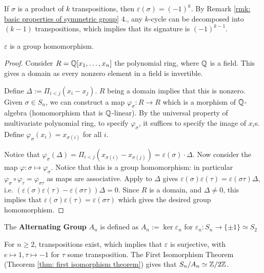 \documentclass{article}
\begin{document}
\begin{example}
    If $\sigma$ is a product of $k$ transpositions, then $\varepsilon(\sigma)= (-1)^k$. By Remark \ref{rmk: basic properties of symmetric group} 4., any $k$-cycle can be decomposed into $(k-1)$ transpositions, which implies that its signature is $(-1)^{k-1}$.
\end{example}

\begin{proposition}
    $\varepsilon$ is a group homomorphism.
\end{proposition}

\begin{proof}
    Consider $R = \mathbb{Q}[x_1, \dots, x_n]$ the polynomial ring, where $\mathbb{Q}$ is a field. This gives a domain as every nonzero element in a field is invertible. 

    Define $\Delta := \Pi_{i < j} (x_i - x_j)$. $R$ being a domain implies that this is nonzero. Given $\sigma \in S_n$, we can construct a map $\varphi_{\sigma}: R \to R$ which is a morphism of $\mathbb{Q}$-algebra (homomorphism that is $\mathbb{Q}$-linear). By the universal property of multivariate polynomial ring, to specify $\varphi_{\sigma}$, it suffices to specify the image of $x_i$s. Define $\varphi_{\sigma}(x_i) = x_{\sigma(i)}$ for all $i$. 
    
    Notice that $\varphi_{\sigma}(\Delta) = \Pi_{i < j} (x_{\sigma(i)} - x_{\sigma(j)}) = \varepsilon(\sigma) \cdot \Delta$. Now consider the map $\varphi: \sigma \mapsto \varphi_{\sigma}$. Notice that this is a group homomorphism: in particular $\varphi_{\sigma} \circ \varphi_{\tau} = \varphi_{\sigma\tau}$ as maps are associative. Apply to $\Delta$ gives $\varepsilon(\sigma)\varepsilon(\tau) = \varepsilon(\sigma\tau) \Delta$, i.e. $(\varepsilon(\sigma) \varepsilon(\tau) - \varepsilon(\sigma\tau))\Delta = 0$. Since $R$ is a domain, and $\Delta \neq 0$, this implies that $\varepsilon(\sigma)\varepsilon(\tau) = \varepsilon(\sigma\tau)$ which gives the desired group homomorphism.
\end{proof}

\begin{definition}
    The \textbf{Alternating Group} $A_n$ is defined as $A_n := \ker \varepsilon_n$ for $\varepsilon_n : S_n \to \{\pm 1\} \simeq S_2$
\end{definition}

\begin{remark}
    For $n \geq 2$, transpositions exist, which implies that $\varepsilon$ is surjective, with $e \mapsto 1, \tau \mapsto -1$ for $\tau$ some transposition. The First Isomorphism Theorem (Theorem \ref{thm: first isomorphism theorem}) gives that $S_n / A_n \simeq \mathbb{Z}/2\mathbb{Z}$.
\end{remark}
\end{document}
